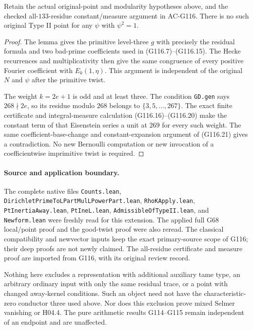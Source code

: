 \begin{corollary}
\label{thm:ACG117quadratic}
Retain the actual original-point and modularity hypotheses above, and
the checked all-$133$-residue constant/measure argument in AC-G116.
There is no such original Type II point for any $\psi$ with $\psi^2=1$.
\end{corollary}
\begin{proof}
The lemma gives the primitive level-three $g$ with precisely the
residual formula and two bad-prime coefficients used in
(G116.7)--(G116.15).  The Hecke recurrences and multiplicativity then
give the same congruence of every positive Fourier coefficient with
$E_k(1,\eta)$.  This argument is independent of the original $N$ and
$\psi$ after the primitive twist.

The weight $k=2e+1$ is odd and at least three.  The condition
\texttt{GD.gen} says $268\nmid2e$, so its residue modulo $268$
belongs to $\{3,5,\ldots,267\}$.  The exact finite certificate and
integral-measure calculation (G116.16)--(G116.20) make the constant
term of that Eisenstein series a unit at $269$ for every such weight.
The same coefficient-base-change and constant-expansion argument of
(G116.21) gives a contradiction.  No new Bernoulli computation or
new invocation of a coefficientwise imprimitive twist is required.
\end{proof}

\paragraph{Source and application boundary.}
The complete native files \texttt{Counts.lean},
\texttt{DirichletPrimeToLPartMulLPowerPart.lean},
\texttt{RhoKApply.lean}, \texttt{PtInertiaAway.lean},
\texttt{PtIneL.lean}, \texttt{AdmissibleOfTypeII.lean}, and
\texttt{Newform.lean} were freshly read for this extension.
The applied full G68 local/point proof and the good-twist proof were
also reread.  The classical compatibility and newvector inputs keep
the exact primary-source scope of G116; their deep proofs are not
newly claimed.  The all-residue certificate and measure proof are
imported from G116, with its original review record.

Nothing here excludes a representation with additional auxiliary
tame type, an arbitrary ordinary input with only the same residual
trace, or a point with changed away-kernel conditions.  Such an object
need not have the characteristic-zero conductor three used above.
Nor does this exclusion prove mixed Selmer vanishing or H04.4.
The pure arithmetic results G114--G115 remain independent of an
endpoint and are unaffected.
